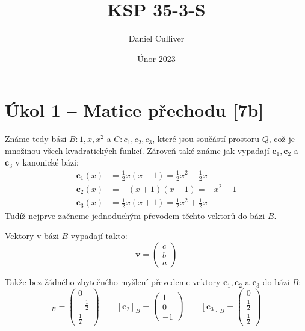 \documentclass{../../../ksp}
\title{KSP 35-3-S}
\author{Daniel Culliver}
\date{Únor 2023}
\begin{document}
\maketitle

\section*{Úkol 1 – Matice přechodu [7b]}

Známe tedy bázi $B: 1, x, x^2$ a $C: c_1, c_2, c_3$, které jsou součástí prostoru $Q$, což je množinou všech kvadratických funkcí.
Zároveň také známe jak vypadají $\bm{c}_1, \bm{c}_2$ a $\bm{c}_3$ v kanonické bázi:
\begin{equation}
    \begin{split}        
        \bm{c}_1(x) & = \frac{1}{2}x(x-1) = \frac{1}{2}x^2 - \frac{1}{2}x \\
        \bm{c}_2(x) & = -(x+1)(x-1) = -x^2 + 1 \\
        \bm{c}_3(x) & = \frac{1}{2}x(x+1) = \frac{1}{2}x^2 + \frac{1}{2}x
    \end{split}
\end{equation}
Tudíž nejprve začneme jednoduchým převodem těchto vektorů do bázi $B$.

Vektory v bázi $B$ vypadají takto:
\begin{equation}
    \bm{v} =
    \begin{pmatrix}
        c\\
        b\\
        a
    \end{pmatrix}
\end{equation}

Takže bez žádného zbytečného myšlení převedeme vektory  $\bm{c}_1, \bm{c}_2$ a $\bm{c}_3$ do bázi $B$:
\begin{equation}
        [\bm{c}_1]_B =
        \begin{pmatrix}
            0\\
            -\frac{1}{2}\\
            \frac{1}{2}
        \end{pmatrix}
        \qquad
        [\bm{c}_2]_B =
        \begin{pmatrix}
            1\\
            0\\
            -1
        \end{pmatrix}
        \qquad
        [\bm{c}_3]_B =
        \begin{pmatrix}
            0\\
            \frac{1}{2}\\
            \frac{1}{2}
        \end{pmatrix}
\end{equation}
\end{document}
